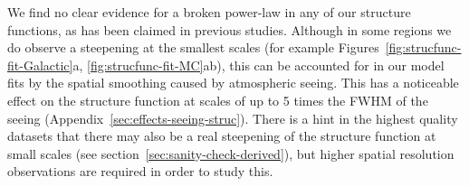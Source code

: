 \documentclass[fleqn,usenatbib, useAMS, a4paper]{mnras}
\begin{document}
We find no clear evidence for a broken power-law in any of our
structure functions, as has been claimed in previous studies.
Although in some regions we do observe a steepening at the smallest scales
(for example Figures~\ref{fig:strucfunc-fit-Galactic}a, \ref{fig:strucfunc-fit-MC}ab),
this can be accounted for in our model fits by
the spatial smoothing caused by atmospheric seeing.
This has a noticeable effect on the structure function at scales of
up to 5 times the FWHM of the seeing (Appendix~\ref{sec:effects-seeing-struc}).
There is a hint in the highest quality datasets that there may also be
a real steepening of the structure function at small scales
(see section~\ref{sec:sanity-check-derived}),
but higher spatial resolution observations are required in order to study this. 

\end{document}
